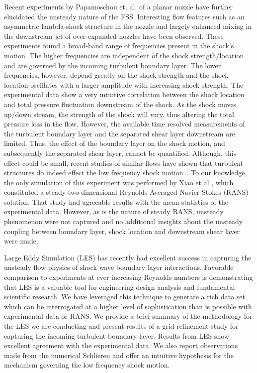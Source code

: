 \documentclass[]{aiaa-tc}%
\begin{document}
Recent experiments by Papamoschou et. al.\cite{Papam:09,Papam:10,Papam:06} of a planar nozzle have further elucidated the unsteady nature of the FSS.  Interesting flow features such as an asymmetric lambda-shock structure in the nozzle and largely enhanced mixing in the downstream jet of over-expanded nozzles have been observed.  These experiments found a broad-band range of frequencies present in the shock's motion.  The higher frequencies are independent of the shock strength/location and are governed by the incoming turbulent boundary layer.  The lower frequencies, however, depend greatly on the shock strength and the shock location oscillates with a larger amplitude with increasing shock strength.  The experimental data show a very intuitive correlation between the shock location and total pressure fluctuation downstream of the shock.  As the shock moves up/down stream, the strength of the shock will vary, thus altering the total pressure loss in the flow.  However, the available time resolved measurements of the turbulent boundary layer and the separated shear layer downstream are limited.  Thus, the effect of the boundary layer on the shock motion, and subsequently the separated shear layer, cannot be quantified.  Although, this effect could be small, recent studies of similar flows have shown that turbulent structures do indeed effect the low frequency shock motion~\cite{Touber:09}.  To our knowledge, the only simulation of this experiment was performed by Xiao et al \cite{Xiao:07}, which constituted a steady two dimensional Reynolds Averaged Navier-Stokes (RANS) solution.  That study had agreeable results with the mean statistics of the experimental data.  However, as is the nature of steady RANS, unsteady phenomenon were not captured and no additional insights about the unsteady coupling between boundary layer, shock location and downstream shear layer were made.

Large Eddy Simulation (LES) has recently had excellent success in capturing the unsteady flow physics of shock wave boundary layer interactions.\cite{Morgan:10b,Kawai:10aiaa,Touber:09,Pirozzoli:09}  Favorable comparison to experiments at ever increasing Reynolds numbers is demonstrating that LES is a valuable tool for engineering design analysis and fundamental scientific research.  We have leveraged this technique to generate a rich data set which can be interrogated at a higher level of sophistication than is possible with experimental data or RANS.  We provide a brief summary of the methodology for the LES we are conducting and present results of a grid refinement study for capturing the incoming turbulent boundary layer.  Results from LES show excellent agreement with the experimental data.  We also report observations made from the numerical Schlieren and offer an intuitive hypothesis for the mechanism governing the low frequency shock motion.  
\end{document}
